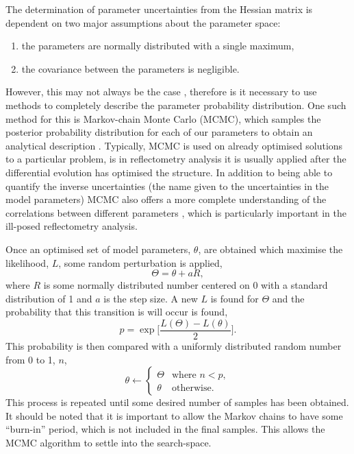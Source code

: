 \documentclass[
 reprint,
 superscriptaddress,
 amsmath,amssymb,
 aps,
]{revtex4-1}
\begin{document}
The determination of parameter uncertainties from the Hessian matrix is dependent on two major assumptions about the parameter space:
\begin{enumerate}
    \item {the parameters are normally distributed with a single maximum,}
    \item {the covariance between the parameters is negligible.}
\end{enumerate}
However, this may not always be the case \cite{mccluskey_bayesian_2019}, therefore is it necessary to use methods to completely describe the parameter probability distribution.
One such method for this is Markov-chain Monte Carlo (MCMC), which samples the posterior probability distribution for each of our parameters to obtain an analytical description \cite{sivia_data_2006}.
Typically, MCMC is used on already optimised solutions to a particular problem, is in reflectometry analysis it is usually applied after the differential evolution has optimised the structure. 
In addition to being able to quantify the inverse uncertainties (the name given to the uncertainties in the model parameters) MCMC also offers a more complete understanding of the correlations between different parameters \cite{gilks_markov_1995}, which is particularly important in the ill-posed reflectometry analysis. 

Once an optimised set of model parameters, $\theta$, are obtained which maximise the likelihood, $L$, some random perturbation is applied, 
%
\begin{equation}
    \Theta = \theta + aR,
\end{equation}
%
where $R$ is some normally distributed number centered on \num{0} with a standard distribution of \num{1} and $a$ is the step size. 
A new $L$ is found for $\Theta$ and the probability that this transition is will occur is found, 
%
\begin{equation}
    p = \exp{\bigg[\frac{L(\Theta) - L(\theta)}{2}\bigg]}. 
\end{equation}
%
This probability is then compared with a uniformly distributed random number from \num{0} to \num{1}, $n$,
%
\begin{equation}
    \theta \leftarrow
    \begin{cases}
        \Theta & \text{where } n < p,\\
        \theta & \text{otherwise}.
    \end{cases}
\end{equation}
%
This process is repeated until some desired number of samples has been obtained. 
It should be noted that it is important to allow the Markov chains to have some ``burn-in'' period, which is not included in the final samples. 
This allows the MCMC algorithm to settle into the search-space. 
\end{document}
